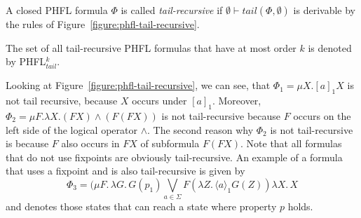 \begin{definition}
    A closed PHFL formula $\Phi$ is called \emph{tail-recursive} if $\emptyset \vdash tail(\Phi, \emptyset)$ is
    derivable by the rules of Figure~\ref{figure:phfl-tail-recursive}.
\end{definition}

The set of all tail-recursive PHFL formulas that have at most order $k$ is denoted by PHFL$^k_{tail}$.

\begin{example}{\cite{lange2014capturing}}
    Looking at Figure~\ref{figure:phfl-tail-recursive}, we can see, that $\Phi_1 = \mu X.[a]_1 X$ is not tail
    recursive, because $X$ occurs under $[a]_1$. Moreover, $\Phi_2 = \mu F .\lambda X. (F X) \wedge (F(F X))$
    is not tail-recursive because $F$ occurs on the left side of the logical operator $\wedge$. The second reason why
    $\Phi_2$ is not tail-recursive is because $F$ also occurs in $F X$ of subformula $F (F X)$. 
    Note that all formulas that do not use fixpoints are obviously tail-recursive. An 
    example of a formula that uses a fixpoint and is also tail-recursive is given by 
    \[\Phi_3 = (\mu F.\,\lambda G.\,G(p_1) \underset{a \in \Sigma}{\bigvee} F (\lambda Z.\,\langle a \rangle_1  G(Z)) \lambda X.\, X\] and denotes those states that can reach a state where property $p$ holds.
\end{example}